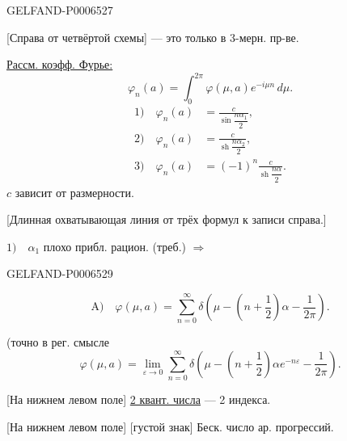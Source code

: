 \begin{GelfandAdjacentEvidence}{GELFAND-P000652}{7}


[Справа от четвёртой схемы] --- это только в 3-мерн. пр-ве.

\underline{Рассм. коэфф. Фурье:}
\[
\varphi_n(a)=\int_0^{2\pi}\varphi(\mu,a)e^{-i\mu n}\,d\mu.
\]
\begin{align*}
1)\quad\varphi_n(a)&=\frac{c}{\sin\dfrac{n\alpha_1}{2}},\\
2)\quad\varphi_n(a)&=\frac{c}{\operatorname{sh}\dfrac{n\alpha_2}{2}},\\
3)\quad\varphi_n(a)&=(-1)^n\frac{c}{\operatorname{sh}\dfrac{n\alpha}{2}}.
\end{align*}
\(c\) зависит от размерности.

[Длинная охватывающая линия от трёх формул к записи справа.]

\(1)\quad\alpha_1\) плохо прибл. рацион. (треб.) \(\Longrightarrow\)

\end{GelfandAdjacentEvidence}
\begin{GelfandAdjacentEvidence}{GELFAND-P000652}{9}

\[
\text{A)}\quad
\varphi(\mu,a)=\sum_{n=0}^{\infty}
\delta\left(\mu-\left(n+\frac12\right)\alpha-\frac1{2\pi}\right).
\]

(точно в рег. смысле
\[
\varphi(\mu,a)=\lim_{\varepsilon\to0}\sum_{n=0}^{\infty}
\delta\left(\mu-\left(n+\frac12\right)\alpha e^{-n\varepsilon}-\frac1{2\pi}\right).
\]

[На нижнем левом поле] \underline{2 квант. числа} --- 2 индекса.

[На нижнем левом поле] [густой знак] Беск. число ар. прогрессий.
\end{GelfandAdjacentEvidence}



